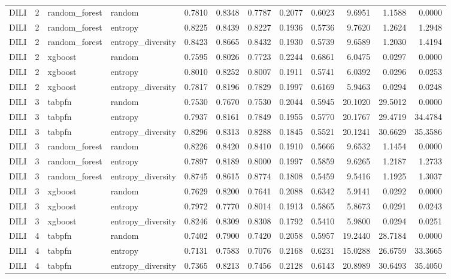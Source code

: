 \begin{tabular}{lrllrrrrrrrr}
DILI & 2 & random_forest & random & 0.7810 & 0.8348 & 0.7787 & 0.2077 & 0.6023 & 9.6951 & 1.1588 & 0.0000 \\
DILI & 2 & random_forest & entropy & 0.8225 & 0.8439 & 0.8227 & 0.1936 & 0.5736 & 9.7620 & 1.2624 & 1.2948 \\
DILI & 2 & random_forest & entropy_diversity & 0.8423 & 0.8665 & 0.8432 & 0.1930 & 0.5739 & 9.6589 & 1.2030 & 1.4194 \\
DILI & 2 & xgboost & random & 0.7595 & 0.8026 & 0.7723 & 0.2244 & 0.6861 & 6.0475 & 0.0297 & 0.0000 \\
DILI & 2 & xgboost & entropy & 0.8010 & 0.8252 & 0.8007 & 0.1911 & 0.5741 & 6.0392 & 0.0296 & 0.0253 \\
DILI & 2 & xgboost & entropy_diversity & 0.7817 & 0.8196 & 0.7829 & 0.1997 & 0.6169 & 5.9463 & 0.0294 & 0.0248 \\
DILI & 3 & tabpfn & random & 0.7530 & 0.7670 & 0.7530 & 0.2044 & 0.5945 & 20.1020 & 29.5012 & 0.0000 \\
DILI & 3 & tabpfn & entropy & 0.7937 & 0.8161 & 0.7849 & 0.1955 & 0.5770 & 20.1767 & 29.4719 & 34.4784 \\
DILI & 3 & tabpfn & entropy_diversity & 0.8296 & 0.8313 & 0.8288 & 0.1845 & 0.5521 & 20.1241 & 30.6629 & 35.3586 \\
DILI & 3 & random_forest & random & 0.8226 & 0.8420 & 0.8410 & 0.1910 & 0.5666 & 9.6532 & 1.1454 & 0.0000 \\
DILI & 3 & random_forest & entropy & 0.7897 & 0.8189 & 0.8000 & 0.1997 & 0.5859 & 9.6265 & 1.2187 & 1.2733 \\
DILI & 3 & random_forest & entropy_diversity & 0.8745 & 0.8615 & 0.8774 & 0.1808 & 0.5459 & 9.5416 & 1.1925 & 1.3037 \\
DILI & 3 & xgboost & random & 0.7629 & 0.8200 & 0.7641 & 0.2088 & 0.6342 & 5.9141 & 0.0292 & 0.0000 \\
DILI & 3 & xgboost & entropy & 0.7972 & 0.7770 & 0.8014 & 0.1913 & 0.5865 & 5.8673 & 0.0291 & 0.0243 \\
DILI & 3 & xgboost & entropy_diversity & 0.8246 & 0.8309 & 0.8308 & 0.1792 & 0.5410 & 5.9800 & 0.0294 & 0.0251 \\
DILI & 4 & tabpfn & random & 0.7402 & 0.7900 & 0.7420 & 0.2058 & 0.5957 & 19.2440 & 28.7184 & 0.0000 \\
DILI & 4 & tabpfn & entropy & 0.7131 & 0.7583 & 0.7076 & 0.2168 & 0.6231 & 15.0288 & 26.6759 & 33.3665 \\
DILI & 4 & tabpfn & entropy_diversity & 0.7365 & 0.8213 & 0.7456 & 0.2128 & 0.6143 & 20.8989 & 30.6493 & 35.4050 \\

\end{tabular}
